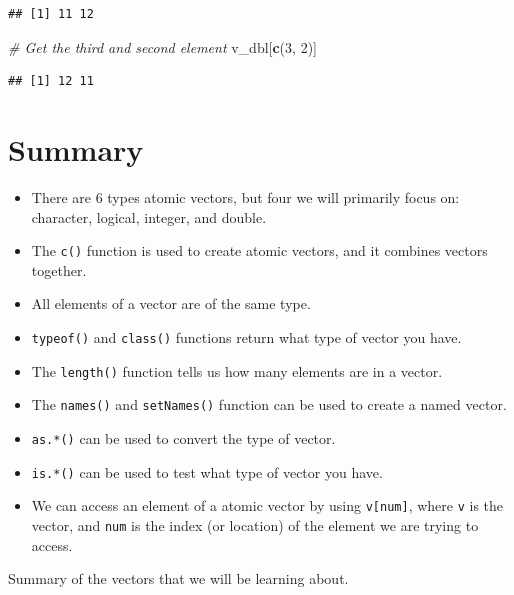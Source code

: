 \documentclass[
]{book}
\newenvironment{Shaded}{\begin{snugshade}}{\end{snugshade}}
\newcommand{\CommentTok}[1]{\textcolor[rgb]{0.56,0.35,0.01}{\textit{#1}}}
\newcommand{\DecValTok}[1]{\textcolor[rgb]{0.00,0.00,0.81}{#1}}
\newcommand{\KeywordTok}[1]{\textcolor[rgb]{0.13,0.29,0.53}{\textbf{#1}}}
\newcommand{\NormalTok}[1]{#1}
\begin{document}
\begin{verbatim}
## [1] 11 12
\end{verbatim}

\begin{Shaded}
\begin{Highlighting}[]
\CommentTok{# Get the third and second element}
\NormalTok{v_dbl[}\KeywordTok{c}\NormalTok{(}\DecValTok{3}\NormalTok{, }\DecValTok{2}\NormalTok{)]}
\end{Highlighting}
\end{Shaded}

\begin{verbatim}
## [1] 12 11
\end{verbatim}

\hypertarget{summary}{%
\section*{Summary}\label{summary}}

\begin{itemize}
\item
  There are 6 types atomic vectors, but four we will primarily focus on: character, logical, integer, and double.
\item
  The \texttt{c()} function is used to create atomic vectors, and it combines vectors together.
\item
  All elements of a vector are of the same type.
\item
  \texttt{typeof()} and \texttt{class()} functions return what type of vector you have.
\item
  The \texttt{length()} function tells us how many elements are in a vector.
\item
  The \texttt{names()} and \texttt{setNames()} function can be used to create a named vector.
\item
  \texttt{as.*()} can be used to convert the type of vector.
\item
  \texttt{is.*()} can be used to test what type of vector you have.
\item
  We can access an element of a atomic vector by using \texttt{v{[}num{]}}, where \texttt{v} is the vector, and \texttt{num} is the index (or location) of the element we are trying to access.
\end{itemize}

Summary of the vectors that we will be learning about.
\end{document}
